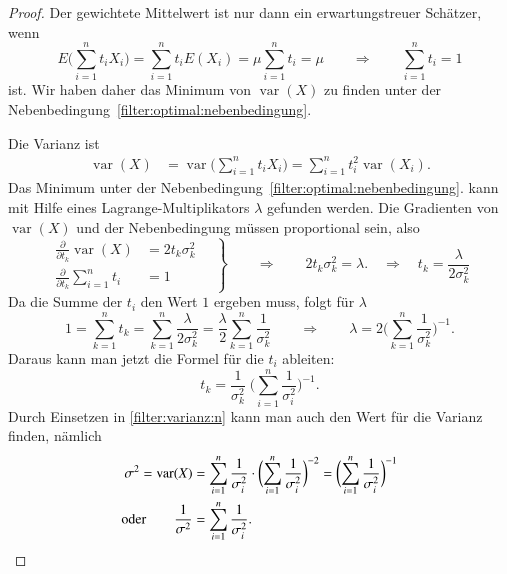\begin{proof}
Der gewichtete Mittelwert ist nur dann ein erwartungstreuer Schätzer, wenn
\begin{equation}
E\biggl(\sum_{i=1}^n t_iX_i\biggr)
=
\sum_{i=1}^n t_iE(X_i)=\mu\sum_{i=1}^nt_i = \mu
\qquad\Rightarrow\qquad
\sum_{i=1}^n t_i = 1
\label{filter:optimal:nebenbedingung}
\end{equation}
ist.
Wir haben daher das Minimum von $\operatorname{var}(X)$ zu finden unter
der Nebenbedingung~\eqref{filter:optimal:nebenbedingung}.

Die Varianz ist
\begin{align}
\operatorname{var}(X)
&=
\operatorname{var}\biggl(
\sum_{i=1}^n t_iX_i
\biggr)
=
\sum_{i=1}^n t_i^2 \operatorname{var}(X_i).
\label{filter:varianz:n}
\end{align}
Das Minimum unter der Nebenbedingung~\eqref{filter:optimal:nebenbedingung}.
kann mit Hilfe eines Lagrange-Multiplikators $\lambda$ gefunden werden.
Die Gradienten von $\operatorname{var}(X)$ und der Nebenbedingung müssen
proportional sein, also
\begin{equation}
\left.
\begin{aligned}
\frac{\partial}{\partial t_k} \operatorname{var}(X)
&= 2t_k \sigma_k^2
\\
\frac{\partial}{\partial t_k}\sum_{i=1}^nt_i&=1
\end{aligned}
\quad
\right\}
\qquad
\Rightarrow
\qquad
2t_k \sigma_k^2 =\lambda.
\quad
\Rightarrow
\quad
t_k = \frac{\lambda}{2\sigma_k^2}
\end{equation}
Da die Summe der $t_i$ den Wert $1$ ergeben muss, folgt für $\lambda$
\[
1
=
\sum_{k=1}^n t_k
=
\sum_{k=1}^n \frac{\lambda}{2\sigma_k^2}
=
\frac{\lambda}{2}\sum_{k=1}^{n} \frac{1}{\sigma_k^2}
\qquad\Rightarrow\qquad
\lambda = 2\biggl(
\sum_{k=1}^{n} \frac{1}{\sigma_k^2}
\biggr)^{-1}.
\]
Daraus kann man jetzt die Formel für die $t_i$ ableiten:
\[
t_k
=
\frac{1}{\sigma_k^2} \;\biggl(\sum_{i=1}^n \frac{1}{\sigma_i^2}\biggr)^{-1}.
\]
Durch Einsetzen in \eqref{filter:varianz:n} kann man auch den Wert für
die Varianz finden, nämlich
\begin{align*}
\sigma^2
=
\operatorname{var}(X)
&=
\sum_{i=1}^n \frac{1}{\sigma_i^2}
\cdot
\biggl(\sum_{i=1}^n \frac{1}{\sigma_i^2}\biggr)^{-2}
=
\biggl(\sum_{i=1}^n \frac{1}{\sigma_i^2}\biggr)^{-1}
\\
\text{oder}\qquad
\frac{1}{\sigma^2}
&=
\sum_{i=1}^n \frac{1}{\sigma_i^2}.
\qedhere
\end{align*}
\end{proof}
